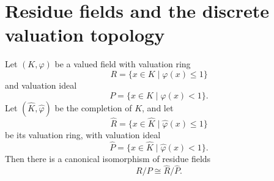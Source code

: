 \section{Residue fields and the discrete valuation topology}

\begin{theorem}
    Let \((K,\varphi)\) be a valued field with valuation ring
    \[
        R=\{x\in K\mid \varphi(x)\leq 1\}
    \]
    and valuation ideal
    \[
        P=\{x\in K\mid \varphi(x)<1\}.
    \]
    Let \((\widehat{K},\widehat{\varphi})\) be the completion of \(K\), and let
    \[
        \widehat{R}
        =
        \{x\in \widehat{K}\mid \widehat{\varphi}(x)\leq 1\}
    \]
    be its valuation ring, with valuation ideal
    \[
        \widehat{P}
        =
        \{x\in \widehat{K}\mid \widehat{\varphi}(x)<1\}.
    \]
    Then there is a canonical isomorphism of residue fields
    \[
        R/P \cong \widehat{R}/\widehat{P}.
    \]
\end{theorem}

